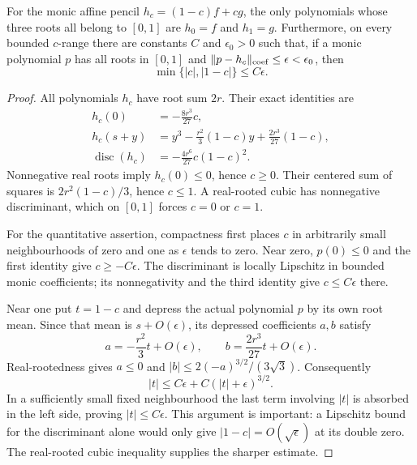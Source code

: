\begin{lemma}\label{lem:cubic-pencil-v94}
For the monic affine pencil $h_c=(1-c)f+cg$, the only polynomials
whose three roots all belong to $[0,1]$ are $h_0=f$ and $h_1=g$.
Furthermore, on every bounded $c$-range there are constants $C$ and
$\epsilon_0>0$ such that, if a monic polynomial $p$ has all roots
in $[0,1]$ and $\|p-h_c\|_{\rm coef}\le\epsilon<\epsilon_0$, then
\[
 \min\{|c|,|1-c|\}\le C\epsilon.
\]
\end{lemma}
\begin{proof}
All polynomials $h_c$ have root sum $2r$. Their exact identities are
\begin{align}
 h_c(0)&=-\frac{8r^3}{27}c,\nonumber\\
 h_c(s+y)&=y^3-\frac{r^2}{3}(1-c)y
                         +\frac{2r^3}{27}(1-c),\label{eq:cubic-identities-v94}\\
 \operatorname{disc}(h_c)&=-\frac{4r^6}{27}c(1-c)^2.\nonumber
\end{align}
Nonnegative real roots imply $h_c(0)\le0$, hence $c\ge0$.
Their centered sum of squares is $2r^2(1-c)/3$, hence $c\le1$.
A real-rooted cubic has nonnegative discriminant, which on $[0,1]$
forces $c=0$ or $c=1$.

For the quantitative assertion, compactness first places $c$ in
arbitrarily small neighbourhoods of zero and one as $\epsilon$
tends to zero. Near zero, $p(0)\le0$ and the first identity give
$c\ge-C\epsilon$. The discriminant is locally Lipschitz in bounded
monic coefficients; its nonnegativity and the third identity give
$c\le C\epsilon$ there.

Near one put $t=1-c$ and depress the actual polynomial $p$ by its
own root mean. Since that mean is $s+O(\epsilon)$, its depressed
coefficients $a,b$ satisfy
\[
 a=-\frac{r^2}{3}t+O(\epsilon),\qquad
 b=\frac{2r^3}{27}t+O(\epsilon).
\]
Real-rootedness gives $a\le0$ and
$|b|\le 2(-a)^{3/2}/(3\sqrt3)$. Consequently
\[
 |t|\le C\epsilon+C(|t|+\epsilon)^{3/2}.
\]
In a sufficiently small fixed neighbourhood the last term involving
$|t|$ is absorbed in the left side, proving $|t|\le C\epsilon$.
This argument is important: a Lipschitz bound for the discriminant
alone would only give $|1-c|=O(\sqrt\epsilon)$ at its double zero.
The real-rooted cubic inequality supplies the sharper estimate.
\end{proof}

